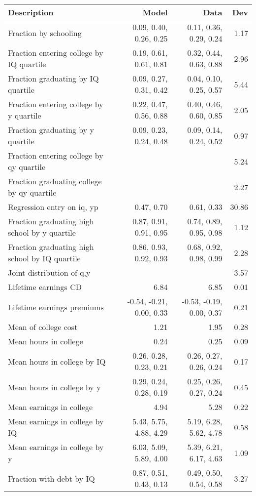 \begin{tabular}{lrrr}
\hline
Description & Model  & Data  & Dev  \\ 
\hline
Fraction by schooling & 0.09, 0.40, 0.26, 0.25  & 0.11, 0.36, 0.29, 0.24  & 1.17  \\ 
Fraction entering college by IQ quartile & 0.19, 0.61, 0.61, 0.81  & 0.32, 0.44, 0.63, 0.88  & 2.96  \\ 
Fraction graduating by IQ quartile & 0.09, 0.27, 0.31, 0.42  & 0.04, 0.10, 0.25, 0.57  & 5.44  \\ 
Fraction entering college by y quartile & 0.22, 0.47, 0.56, 0.88  & 0.40, 0.46, 0.60, 0.85  & 2.05  \\ 
Fraction graduating by y quartile & 0.09, 0.23, 0.24, 0.48  & 0.09, 0.14, 0.24, 0.52  & 0.97  \\ 
Fraction entering college by qy quartile &   &   & 5.24  \\ 
Fraction graduating college by qy quartile &   &   & 2.27  \\ 
Regression entry on iq, yp & 0.47, 0.70  & 0.61, 0.33  & 30.86  \\ 
Fraction graduating high school by y quartile & 0.87, 0.91, 0.91, 0.95  & 0.74, 0.89, 0.95, 0.98  & 1.12  \\ 
Fraction graduating high school by IQ quartile & 0.86, 0.93, 0.92, 0.93  & 0.68, 0.92, 0.98, 0.99  & 2.28  \\ 
Joint distribution of q,y &   &   & 3.57  \\ 
Lifetime earnings CD & 6.84  & 6.85  & 0.01  \\ 
Lifetime earnings premiums & -0.54, -0.21, 0.00, 0.33  & -0.53, -0.19, 0.00, 0.37  & 0.21  \\ 
Mean of college cost & 1.21  & 1.95  & 0.28  \\ 
Mean hours in college & 0.24  & 0.25  & 0.09  \\ 
Mean hours in college by IQ & 0.26, 0.28, 0.23, 0.21  & 0.26, 0.27, 0.26, 0.24  & 0.17  \\ 
Mean hours in college by y & 0.29, 0.24, 0.28, 0.19  & 0.25, 0.26, 0.27, 0.24  & 0.45  \\ 
Mean earnings in college & 4.94  & 5.28  & 0.22  \\ 
Mean earnings in college by IQ & 5.43, 5.75, 4.88, 4.29  & 5.19, 6.28, 5.62, 4.78  & 0.58  \\ 
Mean earnings in college by y & 6.03, 5.09, 5.89, 4.00  & 5.39, 6.21, 6.17, 4.63  & 1.09  \\ 
Fraction with debt by IQ & 0.87, 0.51, 0.43, 0.13  & 0.49, 0.50, 0.54, 0.58  & 3.27  \\ 

\end{tabular}
